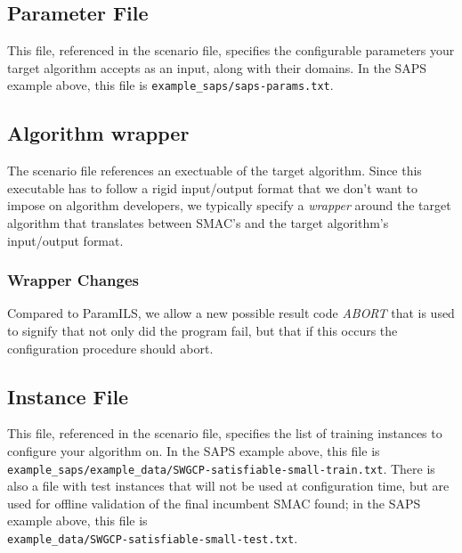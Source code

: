 \documentclass[11pt,letterpaper,twoside]{article}
\begin{document}
\subsection{Parameter File}
This file, referenced in the scenario file, specifies the configurable parameters your target algorithm accepts as an input, along with their domains. In the SAPS example above, this file is \texttt{example\_saps/saps-params.txt}.

\subsection{Algorithm wrapper}
The scenario file references an exectuable of the target algorithm. Since this executable has to follow a rigid input/output format that we don't want to impose on algorithm developers, we typically specify a \emph{wrapper} around the target algorithm that translates between SMAC's and the target algorithm's input/output format.
 
\subsubsection{Wrapper Changes}
Compared to ParamILS, we allow a new possible result code \emph{ABORT} that is used to signify that not only did the program fail, but that if this occurs the configuration procedure should abort.

\subsection{Instance File}
This file, referenced in the scenario file, specifies the list of training instances to configure your algorithm on. 
In the SAPS example above, this file is\\
\texttt{example\_saps/example\_data/SWGCP-satisfiable-small-train.txt}.
There is also a file with test instances that will not be used at configuration time, but are used for offline validation of the final incumbent SMAC found; in the SAPS example above, this file is\\ \texttt{example\_data/SWGCP-satisfiable-small-test.txt}.
\end{document}
